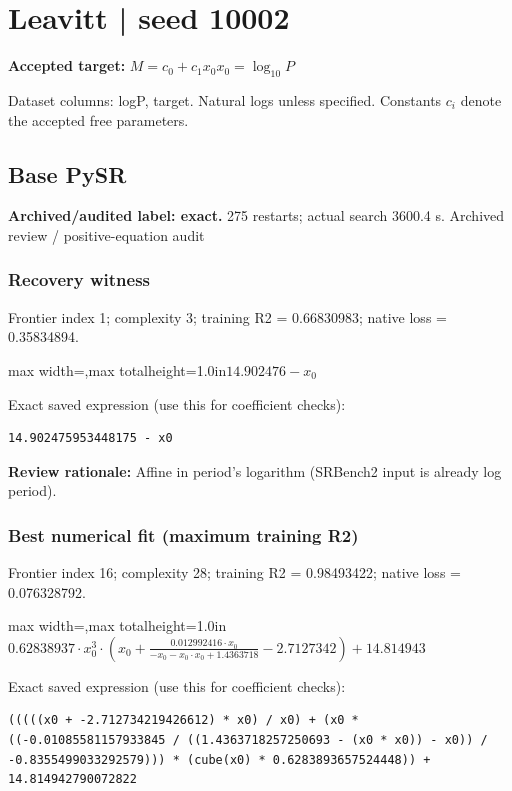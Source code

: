 \documentclass[10pt,letterpaper,landscape]{article}
\begin{document}
\section*{Leavitt | seed 10002}
\textbf{Accepted target:} $\displaystyle M=c_0+c_1x_0$\hfill $x_0=\log_{10}P$\par
{\small Dataset columns: logP, target. Natural logs unless specified. Constants $c_i$ denote the accepted free parameters.}\par\medskip
\begin{minipage}[t]{0.485\textwidth}
\subsection*{Base PySR}
\textbf{Archived/audited label: exact.} 275 restarts; actual search 3600.4 s.
{\small Archived review / positive-equation audit}
\subsubsection*{Recovery witness}
Frontier index 1; complexity 3; training R2 = 0.66830983; native loss = 0.35834894.
\begin{center}\begin{adjustbox}{max width=\linewidth,max totalheight=1.0in}$\displaystyle 14.902476 - x_{0}$\end{adjustbox}\end{center}
{\scriptsize Exact saved expression (use this for coefficient checks):}
\begin{lstlisting}
14.902475953448175 - x0
\end{lstlisting}
{\small\textbf{Review rationale:} Affine in period's logarithm (SRBench2 input is already log period).}
\subsubsection*{Best numerical fit (maximum training R2)}
Frontier index 16; complexity 28; training R2 = 0.98493422; native loss = 0.076328792.
\begin{center}\begin{adjustbox}{max width=\linewidth,max totalheight=1.0in}$\displaystyle 0.62838937 \cdot x_{0}^{3} \cdot \left(x_{0} + \frac{0.012992416 \cdot x_{0}}{- x_{0} - x_{0} \cdot x_{0} + 1.4363718} - 2.7127342\right) + 14.814943$\end{adjustbox}\end{center}
{\scriptsize Exact saved expression (use this for coefficient checks):}
\begin{lstlisting}
(((((x0 + -2.712734219426612) * x0) / x0) + (x0 * ((-0.01085581157933845 / ((1.4363718257250693 - (x0 * x0)) - x0)) / -0.8355499033292579))) * (cube(x0) * 0.6283893657524448)) + 14.814942790072822
\end{lstlisting}
\end{minipage}\hfill
\end{document}
